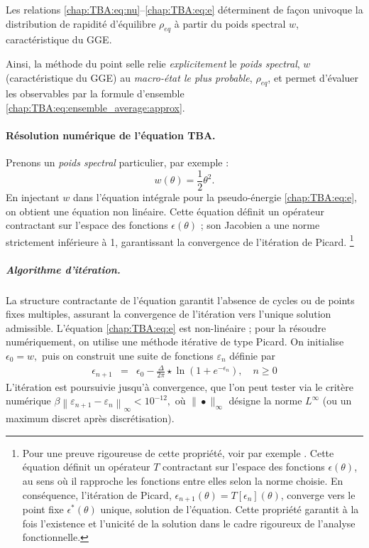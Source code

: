 Les relations \eqref{chap:TBA:eq:nu}–\eqref{chap:TBA:eq:e} déterminent de façon univoque la distribution de rapidité d’équilibre \(\rho_{\!eq}\) à partir du poids spectral \(w\), caractéristique du \gls{GGE}.

\medskip
Ainsi, la méthode du point selle relie \emph{explicitement} le {\em poids spectral}, $w$  (caractéristique du \gls{GGE}) au \emph{macro-état le plus probable}, $\rho_{eq}$, et permet d’évaluer les observables par la formule d’ensemble \eqref{chap:TBA:eq:ensemble_average:approx}.


\paragraph{Résolution numérique de l’équation \gls{TBA}.}\label{para-algho-TBA}

Prenons un {\em poids spectral} particulier, par exemple : 
\begin{equation}
  w(\theta)= \frac{1}{2}\theta^2 .\label{eq:TBA:w:quadra}
\end{equation} 
En injectant $w$ dans l’équation intégrale pour la pseudo-énergie \eqref{chap:TBA:eq:e}, on obtient une équation non linéaire.
Cette équation définit un opérateur contractant sur l’espace des fonctions \( \epsilon(\theta) \) ; son Jacobien a une norme strictement inférieure à 1, garantissant la convergence de l’itération de Picard.
\footnote{Pour une preuve rigoureuse de cette propriété, voir par exemple \cite{Korepin1997}.
Cette équation définit un opérateur \(T\) contractant sur l’espace des fonctions \(\epsilon(\theta)\), au sens où il rapproche les fonctions entre elles selon la norme choisie. 
En conséquence, l’itération de Picard, \(\epsilon_{n+1}(\theta) = T[\epsilon_n](\theta)\), converge vers le point fixe \(\epsilon^*(\theta)\) unique, solution de l’équation. 
Cette propriété garantit à la fois l’existence et l’unicité de la solution dans le cadre rigoureux de l’analyse fonctionnelle.
}


\medskip
\subparagraph{Algorithme d’itération.}  
La structure contractante de l’équation garantit l’absence de cycles ou de points fixes multiples, assurant la convergence de l’itération vers l’unique solution admissible.
L’équation \eqref{chap:TBA:eq:e} est non-linéaire ; pour la résoudre numériquement, on utilise une méthode itérative de type Picard. On initialise
\(
  \epsilon_0 = w ,
\)
puis on construit une suite de fonctions \(\varepsilon_n\) définie par
\begin{eqnarray}
	\epsilon_{n+1} & = & \epsilon_0 -   \frac{\Delta}{2\pi} \star \ln \left( 1 + e^{-\epsilon_n} \right) ,\quad n\ge0 \label{chap2:eq.nrj.1}
\end{eqnarray}
L’itération est poursuivie jusqu’à convergence, que l’on peut tester via le critère numérique
\(
  \beta \left\| \varepsilon_{n+1} - \varepsilon_n \right\|_\infty < 10^{-12},
\)
où \(\|\bullet\|_\infty\) désigne la norme \(L^\infty\) (ou un maximum discret après discrétisation).


